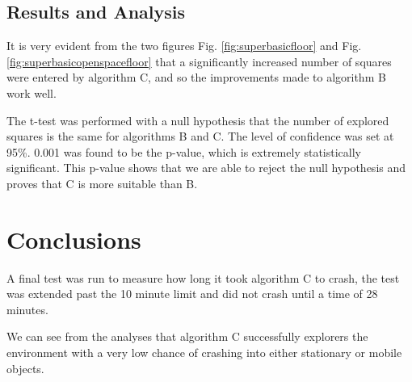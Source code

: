 \documentclass[letterpaper, 10 pt, conference]{ieeeconf}  %
\begin{document}
\subsection{Results and Analysis}
It is very evident from the two figures Fig. \ref{fig:superbasicfloor} and Fig. \ref{fig:superbasicopenspacefloor} that a significantly increased number of squares were entered by algorithm C, and so the improvements made to algorithm B work well.

The t-test was performed with a null hypothesis that the number of explored squares is the same for algorithms B and C. The level of confidence was set at 95\%. 0.001 was found to be the p-value, which is extremely statistically significant. This p-value shows that we are able to reject the null hypothesis and proves that C is more suitable than B.

\section{Conclusions}

A final test was run to measure how long it took algorithm C to crash, the test was extended past the 10 minute limit and did not crash until a time of 28 minutes.

We can see from the analyses that algorithm C successfully explorers the environment with a very low chance of crashing into either stationary or mobile objects.
\end{document}
